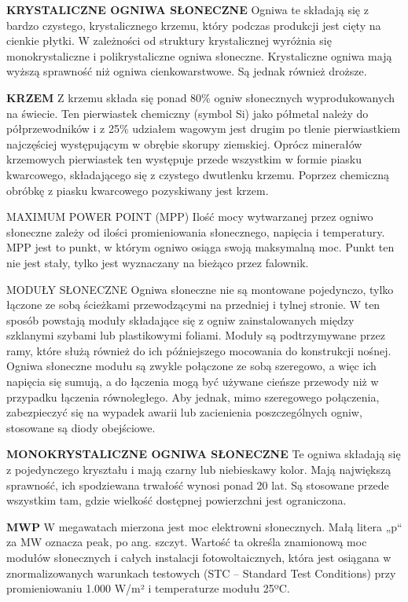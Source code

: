 \documentclass[12pt,a4paper]{article}
\begin{document}
\textbf{KRYSTALICZNE OGNIWA SŁONECZNE}
Ogniwa te składają się z bardzo czystego, krystalicznego krzemu, który podczas produkcji jest cięty na cienkie płytki. W zależności od struktury krystalicznej wyróżnia się monokrystaliczne i polikrystaliczne ogniwa słoneczne. Krystaliczne ogniwa mają wyższą sprawność niż ogniwa cienkowarstwowe. Są jednak również droższe.


\textbf{KRZEM}
Z krzemu składa się ponad 80\% ogniw słonecznych wyprodukowanych na świecie. Ten pierwiastek chemiczny (symbol Si) jako półmetal należy do półprzewodników i z 25\% udziałem wagowym jest drugim po tlenie pierwiastkiem najczęściej występującym w obrębie skorupy ziemskiej. Oprócz minerałów krzemowych pierwiastek ten występuje przede wszystkim w formie piasku kwarcowego, składającego się z czystego dwutlenku krzemu. Poprzez chemiczną obróbkę z piasku kwarcowego pozyskiwany jest krzem.

MAXIMUM POWER POINT (MPP)
Ilość mocy wytwarzanej przez ogniwo słoneczne zależy od ilości promieniowania słonecznego, napięcia i temperatury. MPP jest to punkt, w którym ogniwo osiąga swoją maksymalną moc. Punkt ten nie jest stały, tylko jest wyznaczany na bieżąco przez falownik.

MODUŁY SŁONECZNE
Ogniwa słoneczne nie są montowane pojedynczo, tylko łączone ze sobą ścieżkami przewodzącymi na przedniej i tylnej stronie. W ten sposób powstają moduły składające się z ogniw zainstalowanych między szklanymi szybami lub plastikowymi foliami. Moduły są podtrzymywane przez ramy, które służą również do ich późniejszego mocowania do konstrukcji nośnej. Ogniwa słoneczne modułu są zwykle połączone ze sobą szeregowo, a więc ich napięcia się sumują, a do łączenia mogą być używane cieńsze przewody niż w przypadku łączenia równoległego. Aby jednak, mimo szeregowego połączenia, zabezpieczyć się na wypadek awarii lub zacienienia poszczególnych ogniw, stosowane są diody obejściowe.

\textbf{MONOKRYSTALICZNE OGNIWA SŁONECZNE}
Te ogniwa składają się z pojedynczego kryształu i mają czarny lub niebieskawy kolor. Mają największą sprawność, ich spodziewana trwałość wynosi ponad 20 lat. Są stosowane przede wszystkim tam, gdzie wielkość dostępnej powierzchni jest ograniczona.


\textbf{MWP}
W megawatach mierzona jest moc elektrowni słonecznych. Małą litera „p“ za MW oznacza peak, po ang. szczyt. Wartość ta określa znamionową moc modułów słonecznych i całych instalacji fotowoltaicznych, która jest osiągana w znormalizowanych warunkach testowych (STC – Standard Test Conditions) przy promieniowaniu 1.000 W/m² i temperaturze modułu 25ºC.
\end{document}
